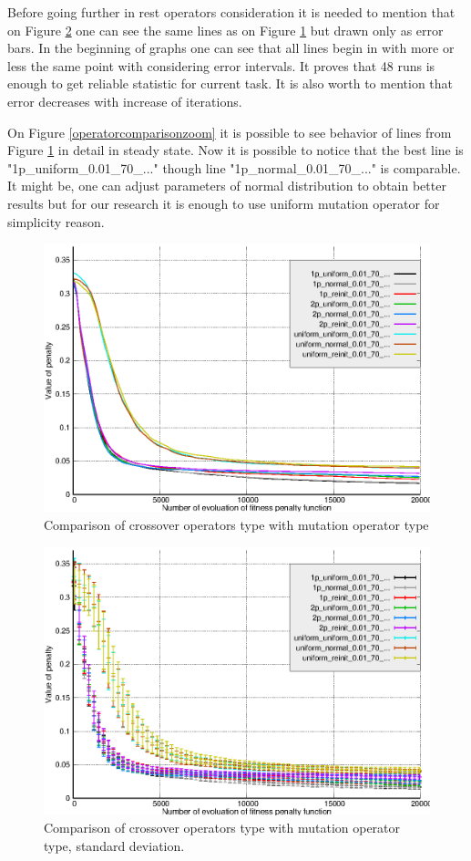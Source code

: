 \documentclass[12pt]{report}
\begin{document}
Before going further in rest operators consideration it is needed to mention that on Figure \ref{operatorcomparisonerr} one can see the same lines as on Figure \ref{operatorcomparison} but drawn only as error bars. In the beginning of graphs one can see that all lines begin in with more or less the same point with considering error intervals. It proves that 48 runs is enough to get reliable statistic for current task. It is also worth to mention that error decreases with increase of iterations.

On Figure \ref{operatorcomparisonzoom} it is possible to see behavior of lines from Figure \ref{operatorcomparison} in detail in steady state. Now it is possible to notice that the best line is "1p\_uniform\_0.01\_70\_..." though line "1p\_normal\_0.01\_70\_..." is comparable. It might be, one can adjust parameters of normal distribution to obtain better results but for our research it is enough to use uniform mutation operator for simplicity reason.

\begin{figure}
    \centering
    \includegraphics[width=5.0in]{operators_comparison}
    \caption{Comparison of crossover operators type with mutation operator type}
    \label{operatorcomparison}
\end{figure}

\begin{figure}
    \centering
    \includegraphics[width=5.0in]{operators_comparison_err}
    \caption{Comparison of crossover operators type with mutation operator type, standard deviation.}
    \label{operatorcomparisonerr}
\end{figure}
\end{document}

